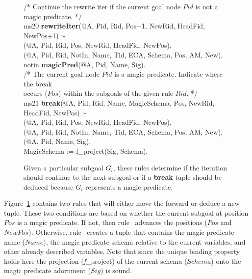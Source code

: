 \begin{figure}[!t]
\ssp
\centering
\begin{boxedminipage}{\linewidth}
/* Continue the rewrite iter if the current goal node $Pid$ is not a magic predicate. */ \\
ms20 {\bf rewriteIter}(@A, Pid, Rid, Pos+1, NewRid, HeadFid, NewPos+1) :- \\
(@A, Pid, Rid, Pos, NewRid, HeadFid, NewPos), \\
(@A, Pid, Rid, NotIn, Name, Tid, ECA, Schema, Pos, AM, New), \\
\datalogspace notin {\bf magicPred}(@A, Pid, Name, Sig). \\

/* The current goal node $Pid$ is a magic predicate. Indicate where the break \\
occurs ($Pos$) within the subgoals of the given rule $Rid$. */ \\
ms21 {\bf break}(@A, Pid, Rid, Name, MagicSchema, Pos, NewRid, HeadFid, NewPos) :- \\
(@A, Pid, Rid, Pos, NewRid, HeadFid, NewPos), \\
(@A, Pid, Rid, NotIn, Name, Tid, ECA, Schema, Pos, AM, New), \\
(@A, Pid, Name, Sig), \\
\datalogspace MagicSchema := f\_project(Sig, Schema). \\

\end{boxedminipage}
\caption{\label{ch:magic:fig:rewrite4} Given a particular subgoal $G_i$, these rules determine
if the iteration should continue to the next subgoal or if a {\bf break} tuple should be
deduced because $G_i$ represents a magic predicate. }
\end{figure}

Figure~\ref{ch:magic:fig:rewrite4} contains two rules that will either move the
 forward or deduce a new  tuple.  These two conditions
are based on whether the current subgoal at position $Pos$ is a magic
predicate.  If not, then rule~ advances the  positions
($Pos$ and $NewPos$).  Otherwise, rule~ creates a  tuple
that contains the magic predicate name ($Name$), the magic predicate schema
relative to the current variables, and other already described variables.  Note
that since the unique binding property holds here the projection ({\emph
f\_project}) of the current schema ($Schema$) onto the magic predicate
adornment ($Sig$) is sound.


